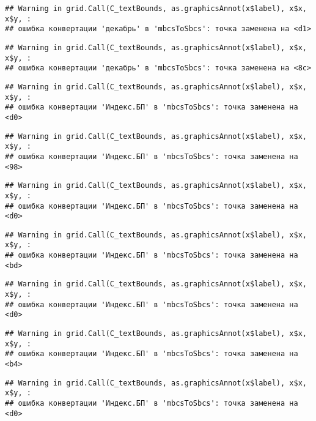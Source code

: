 \documentclass[
]{article}
\begin{document}
\begin{verbatim}
## Warning in grid.Call(C_textBounds, as.graphicsAnnot(x$label), x$x, x$y, :
## ошибка конвертации 'декабрь' в 'mbcsToSbcs': точка заменена на <d1>
\end{verbatim}

\begin{verbatim}
## Warning in grid.Call(C_textBounds, as.graphicsAnnot(x$label), x$x, x$y, :
## ошибка конвертации 'декабрь' в 'mbcsToSbcs': точка заменена на <8c>
\end{verbatim}

\begin{verbatim}
## Warning in grid.Call(C_textBounds, as.graphicsAnnot(x$label), x$x, x$y, :
## ошибка конвертации 'Индекс.БП' в 'mbcsToSbcs': точка заменена на <d0>
\end{verbatim}

\begin{verbatim}
## Warning in grid.Call(C_textBounds, as.graphicsAnnot(x$label), x$x, x$y, :
## ошибка конвертации 'Индекс.БП' в 'mbcsToSbcs': точка заменена на <98>
\end{verbatim}

\begin{verbatim}
## Warning in grid.Call(C_textBounds, as.graphicsAnnot(x$label), x$x, x$y, :
## ошибка конвертации 'Индекс.БП' в 'mbcsToSbcs': точка заменена на <d0>
\end{verbatim}

\begin{verbatim}
## Warning in grid.Call(C_textBounds, as.graphicsAnnot(x$label), x$x, x$y, :
## ошибка конвертации 'Индекс.БП' в 'mbcsToSbcs': точка заменена на <bd>
\end{verbatim}

\begin{verbatim}
## Warning in grid.Call(C_textBounds, as.graphicsAnnot(x$label), x$x, x$y, :
## ошибка конвертации 'Индекс.БП' в 'mbcsToSbcs': точка заменена на <d0>
\end{verbatim}

\begin{verbatim}
## Warning in grid.Call(C_textBounds, as.graphicsAnnot(x$label), x$x, x$y, :
## ошибка конвертации 'Индекс.БП' в 'mbcsToSbcs': точка заменена на <b4>
\end{verbatim}

\begin{verbatim}
## Warning in grid.Call(C_textBounds, as.graphicsAnnot(x$label), x$x, x$y, :
## ошибка конвертации 'Индекс.БП' в 'mbcsToSbcs': точка заменена на <d0>
\end{verbatim}
\end{document}
